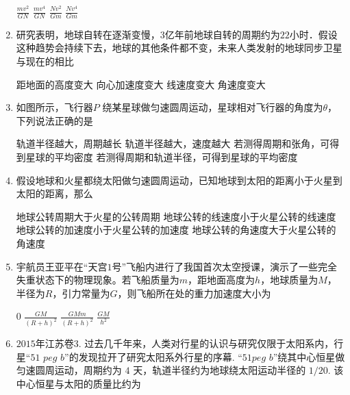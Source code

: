 \begin{enumerate}[leftmargin=0em]
\fourchoices
{$ \frac { m v ^ { 2 } } { G N } $}
{$ \frac { m v ^ { 4 } } { G N } $}
{$ \frac { N v ^ { 2 } } { G m } $}
{$ \frac { N v ^ { 4 } } { G m } $}


\item 
{}
研究表明，地球自转在逐渐变慢，$ 3 $亿年前地球自转的周期约为$ 22 $小时．假设这种趋势会持续下去，地球的其他条件都不变，未来人类发射的地球同步卫星与现在的相比  

\fourchoices
{距地面的高度变大}
{向心加速度变大}
{线速度变大}
{角速度变大}



\item 
{}
如图所示，飞行器$ P $ 绕某星球做匀速圆周运动，星球相对飞行器的角度为$ \theta $，下列说法正确的是  
\begin{figure}[h!]
\centering

\end{figure}

\fourchoices
{轨道半径越大，周期越长}
{轨道半径越大，速度越大}
{若测得周期和张角，可得到星球的平均密度}
{若测得周期和轨道半径，可得到星球的平均密度}




\item 
{}
假设地球和火星都绕太阳做匀速圆周运动，已知地球到太阳的距离小于火星到太阳的距离，那么  

\fourchoices
{地球公转周期大于火星的公转周期}
{地球公转的线速度小于火星公转的线速度}
{地球公转的加速度小于火星公转的加速度}
{地球公转的角速度大于火星公转的角速度}

\item 
{}
宇航员王亚平在“天宫$ 1 $号”飞船内进行了我国首次太空授课，演示了一些完全失重状态下的物理现象。若飞船质量为$ m $，距地面高度为$ h $，地球质量为$ M $，半径为$ R $，引力常量为$ G $，则飞船所在处的重力加速度大小为  

\fourchoices
{$ 0 $}
{$ \frac { G M } { ( R + h ) ^ { 2 } } $}
{$ \frac { G M m } { ( R + h ) ^ { 2 } } $}
{$ \frac { G M } { h ^ { 2 } } $}


\item
$ 2015 $年江苏卷$ 3 $. 过去几千年来，人类对行星的认识与研究仅限于太阳系内，行星“$ 51 $ $ peg $ $ b $”的发现拉开了研究太阳系外行星的序幕. “$ 51peg $ $ b $”绕其中心恒星做匀速圆周运动，周期约为 $ 4 $ 天，轨道半径约为地球绕太阳运动半径的 $ 1/20 $. 该中心恒星与太阳的质量比约为  



\end{enumerate}
